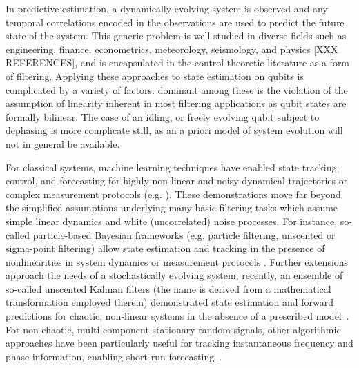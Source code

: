 \documentclass[pra, reprint]{revtex4-1}
\begin{document}
In predictive estimation, a dynamically evolving system is observed and any temporal correlations encoded in the observations are used to predict the future state of the system.  This generic problem is well studied in diverse fields such as engineering, finance, econometrics, meteorology, seismology, and physics [XXX REFERENCES], and is encapsulated in the control-theoretic literature as a form of filtering.  Applying these approaches to state estimation on qubits is complicated by a variety of factors: dominant among these is the violation of the assumption of linearity inherent in most filtering applications as qubit states are formally bilinear. The case of an idling, or freely evolving qubit subject to dephasing is more complicate still, as an a priori model of system evolution will not in general be available.

For classical systems, machine learning techniques have enabled state tracking, control, and forecasting for highly non-linear and noisy dynamical trajectories or complex measurement protocols (e.g. \cite{garcia2016optimal, bach2004learning, tatinati2013hybrid, hall2011reinforcement, hamilton2016ensemble}). These demonstrations move far beyond the simplified assumptions underlying many basic filtering tasks which assume simple linear dynamics and white (uncorrelated) noise processes. For instance, so-called particle-based Bayesian frameworks (e.g. particle filtering, unscented or sigma-point filtering) allow state estimation and tracking in the presence of nonlinearities in system dynamics or measurement protocols \cite{candy2016bayesian}.  Further extensions approach the needs of a stochastically evolving system; recently, an ensemble of so-called unscented Kalman filters (the name is derived from a mathematical transformation employed therein) demonstrated state estimation and forward predictions for chaotic, non-linear systems in the absence of a prescribed model~\cite{hamilton2016ensemble}. For non-chaotic, multi-component stationary random signals, other algorithmic approaches have been particularly useful for tracking instantaneous frequency and phase information, enabling short-run forecasting~\cite{boashash1992estimating2, ji2016gradient}.  
\end{document}
